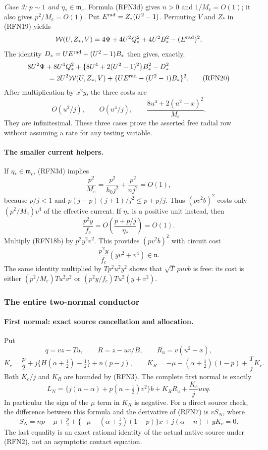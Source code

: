 \emph{Case 3: $p\sim1$ and $\eta_*\in\mathfrak m_c$.}
Formula (RFN3d) gives $n>0$ and $1/M_e=O(1)$; it also gives
$p^2/M_e=O(1)$.  Put $E^{\rm rad}=Z_*(U^2-1)$.
Permuting $V$ and $Z_*$ in (RFN19) yields
\[
 \mathcal W(U,Z_*,V)
   =4\Psi+4U^2Q_*^2+4U^2B_*^2-(E^{\rm rad})^2.
\]
The identity $D_*=UE^{\rm rad}+(U^2-1)B_*$ then gives, exactly,
\begin{align}
 &8U^2\Psi+8U^4Q_*^2+
   \{8U^4+2(U^2-1)^2\}B_*^2-D_*^2\\
 &\hspace{10mm}=2U^2\mathcal W(U,Z_*,V)
                 +\{UE^{\rm rad}-(U^2-1)B_*\}^2.        \tag{RFN20}
\end{align}
After multiplication by $x^2y$, the three costs are
\[
 O(u^2/j),\qquad O(u^4/j),\qquad
 \frac{8u^4+2(u^2-x)^2}{M_e}.
\]
They are infinitesimal.  These three cases prove the asserted free
radial row without assuming a rate for any testing variable.

\paragraph{The smaller current helpers.}
If $\eta_*\in\mathfrak m_c$, (RFN3d) implies
\[
 \frac{p^2}{M_e}
 =\frac{p^2}{h_0j^2}+\frac{p^2}{nj^2}=O(1),
\]
because $p/j<1$ and
$p(j-p)(j+1)/j^2\leq p+p/j$.
Thus $(pv^2b)^2$ costs only $(p^2/M_e)v^4$ of the effective current.
If $\eta_*$ is a positive unit instead, then
\[
 \frac{p^2y}{f_c}=O\!\left(\frac{p+p/j}{\eta_*}\right)=O(1).
\]
Multiply (RFN18b) by $p^2y^2v^2$.  This provides $(pv^2b)^2$ with circuit
cost
\[
 \frac{p^2y}{f_c}(yv^2+v^4)\in\mathfrak n.
\]
The same identity multiplied by $Tp^2u^2y^2$ shows that
$\sqrt T\,puvb$ is free: its cost is either
$(p^2/M_e)Tu^2v^2$ or
$(p^2y/f_c)Tu^2(y+v^2)$.

\subsubsection*{The entire two-normal conductor}

\paragraph{First normal: exact source cancellation and allocation.}
Put
\[
 q=vz-Tu,\qquad R=z-uv/B,\qquad R_u=v(u^2-x),
\]
\[
 K_c=\frac p2+j\{H(\alpha+\tfrac12)-\tfrac12\}+n(p-j),
 \qquad
 K_R=-\mu-(\alpha+\tfrac12)(1-p)+\frac TjK_c.
\]
Both $K_c/j$ and $K_R$ are bounded by (RFN3).  The complete first normal
is exactly
\[
 L_N=\{j(n-\alpha)+p(n+\tfrac12)v^2\}b
                  +K_RR_u+\frac{K_c}{j}uvq.            \tag{RFN21}
\]
In particular the sign of the $\mu$ term in $K_R$ is negative.
For a direct source check, the difference between this formula and
the derivative of (RFN7) is $vS_N$, where
\[
 S_N=np-\mu+\tfrac p2+
       \{-\mu-(\alpha+\tfrac12)(1-p)\}x
       +j(\alpha-n)+yK_c=0.
\]
The last equality is an exact rational identity of the actual native
source under (RFN2), not an asymptotic contact equation.

